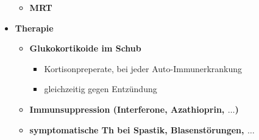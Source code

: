 \begin{itemize}
\begin{itemize}
				\item \textbf{MRT}
			\end{itemize}
		\item \textbf{Therapie}
			\begin{itemize}
				\item \textbf{Glukokortikoide im Schub} 
					\begin{itemize}
						\item Kortisonpreperate, bei jeder Auto-Immunerkrankung
						\item gleichzeitig gegen Entzündung
					\end{itemize}
				\item \textbf{Immunsuppression (Interferone, Azathioprin, $\dots$)}
				\item \textbf{symptomatische Th bei Spastik, Blasenstörungen, $\dots$}
			\end{itemize}
	\end{itemize}
	
